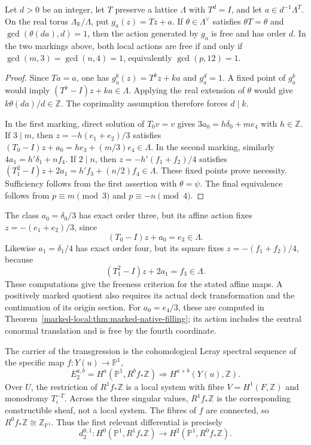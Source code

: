 \documentclass[11pt]{article}
\numberwithin{equation}{section}
\begin{document}
\begin{proposition}\label{prop:affine-free}
Let $d>0$ be an integer, let $T$ preserve a lattice $\Lambda$ with
$T^d=I$, and let
$a\in d^{-1}\Lambda^T$.  On the real torus
$\Lambda_{\mathbb R}/\Lambda$, put $g_a(z)=Tz+a$.
If $\theta\in\Lambda^\vee$ satisfies $\theta T=\theta$ and
$\gcd(\theta(da),d)=1$, then the action generated by $g_a$ is free
and has order $d$.  In the two markings above, both local actions are
free if and only if $\gcd(m,3)=\gcd(n,4)=1$, equivalently
$\gcd(p,12)=1$.
\end{proposition}

\begin{proof}
Since $Ta=a$, one has $g_a^k(z)=T^kz+ka$ and $g_a^d=1$.
A fixed point of $g_a^k$ would imply
$(T^k-I)z+ka\in\Lambda$.  Applying the real extension of $\theta$
would give $k\theta(da)/d\in\mathbb Z$.  The coprimality assumption
therefore forces $d\mid k$.

In the first marking, direct solution of $T_0v=v$ gives
$3a_0=h\delta_0+me_4$ with $h\in\mathbb Z$.
If $3\mid m$, then $z=-h(e_1+e_2)/3$ satisfies
$(T_0-I)z+a_0=he_3+(m/3)e_4\in\Lambda$.
In the second marking, similarly $4a_1=h'\delta_1+nf_4$.
If $2\mid n$, then $z=-h'(f_1+f_2)/4$ satisfies
$(T_1^2-I)z+2a_1=h'f_3+(n/2)f_4\in\Lambda$.
These fixed points prove necessity.  Sufficiency follows from the
first assertion with $\theta=\psi$.  The final equivalence follows
from $p\equiv m\pmod3$ and $p\equiv-n\pmod4$.
\end{proof}

The class $a_0=\delta_0/3$ has exact order three, but its affine action
fixes $z=-(e_1+e_2)/3$, since
\[
             (T_0-I)z+a_0=e_3\in\Lambda.
\]
Likewise $a_1=\delta_1/4$ has exact order four, but its square fixes
$z=-(f_1+f_2)/4$, because
\[
             (T_1^2-I)z+2a_1=f_3\in\Lambda.
\]
These computations give the freeness criterion for the stated affine
maps. A positively marked quotient also requires its actual deck
transformation and the continuation of its origin section. For
$a_0=e_4/3$, these are computed in
Theorem~\ref{marked-local:thm:marked-native-filling}; its action includes
the central conormal translation and is free by the fourth coordinate.

The carrier of the transgression is the cohomological Leray spectral
sequence of the specific map $f:Y(u)\to\mathbb P^1$,
\[
 E_2^{a,b}=H^a(\mathbb P^1,R^bf_*\mathbb Z)
       \Longrightarrow H^{a+b}(Y(u),\mathbb Z).                   \tag{5.2}
\]
Over $U$, the restriction of $R^1f_*\mathbb Z$ is a local system with
fibre $V=H^1(F,\mathbb Z)$ and monodromy $T_i^{-T}$.  Across the three
singular values, $R^1f_*\mathbb Z$ is the corresponding constructible
sheaf, not a local system.  The fibres of $f$ are connected, so
$R^0f_*\mathbb Z\cong\mathbb Z_{\mathbb P^1}$.  Thus the first relevant
differential is precisely
\[
 d_2^{0,1}:H^0(\mathbb P^1,R^1f_*\mathbb Z)
       \longrightarrow H^2(\mathbb P^1,R^0f_*\mathbb Z).          \tag{5.3}
\]
\end{document}
